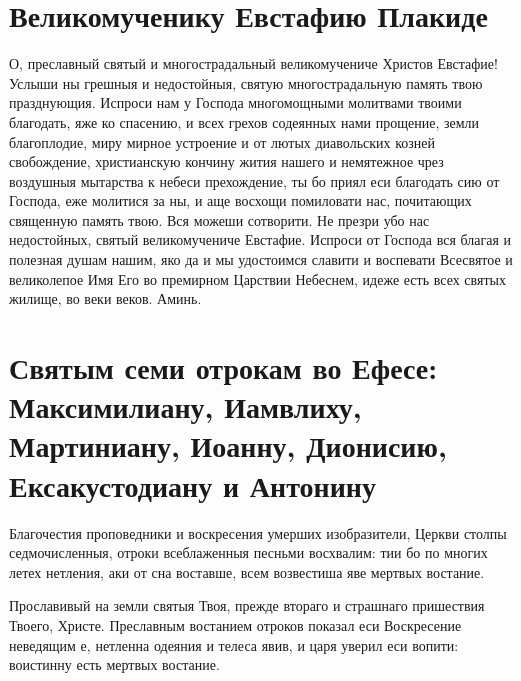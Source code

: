 \section{Великомученику Евстафию Плакиде}




О, преславный святый и многострадальный великомучениче Христов Евстафие! Услыши ны грешныя и недостойныя, святую многострадальную память твою празднующия. Испроси нам у Господа многомощными молитвами твоими благодать, яже ко спасению, и всех грехов содеянных нами прощение, земли благоплодие, миру мирное устроение и от лютых диавольских козней свобождение, христианскую кончину жития нашего и немятежное чрез воздушныя мытарства к небеси прехождение, ты бо приял еси благодать сию от Господа, еже молитися за ны, и аще восхощи помиловати нас, почитающих священную память твою. Вся можеши сотворити. Не презри убо нас недостойных, святый великомучениче Евстафие. Испроси от Господа вся благая и полезная душам нашим, яко да и мы удостоимся славити и воспевати Всесвятое и великолепое Имя Его во премирном Царствии Небеснем, идеже есть всех святых жилище, во веки веков. Аминь. \mychapterending


 

\section{Святым семи отрокам во Ефесе: Максимилиану, Иамвлиху, Мартиниану, Иоанну, Дионисию, Ексакустодиану и Антонину}
 


Благочестия проповедники и воскресения умерших изобразители, Церкви столпы седмочисленныя, отроки всеблаженныя песньми восхвалим: тии бо по многих летех нетления, аки от сна воставше, всем возвестиша яве мертвых востание.




Прославивый на земли святыя Твоя, прежде втораго и страшнаго пришествия Твоего, Христе. Преславным востанием отроков показал еси Воскресение неведящим е, нетленна одеяния и телеса явив, и царя уверил еси вопити: воистинну есть мертвых востание.


